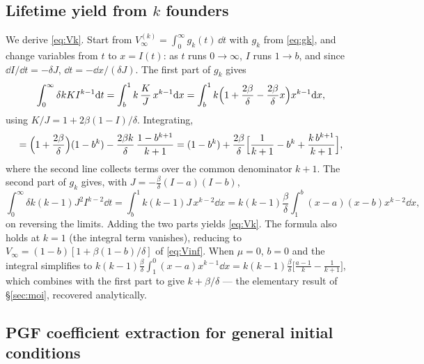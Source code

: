 \subsection{Lifetime yield from $k$ founders}
\label{app:Vk}

We derive \eqref{eq:Vk}. Start from
$V_\infty^{(k)}=\int_0^\infty g_k(t)\,\dd t$ with $g_k$ from
\eqref{eq:gk}, and change variables from $t$ to $x=I(t)$: as $t$ runs
$0\to\infty$, $I$ runs $1\to b$, and since $\dd I/\dd t=-\delta J$,
$\dd t=-\dd x/(\delta J)$. The first part of $g_k$ gives
$$
\int_0^\infty\delta k K I^{k-1}{\rm d} t
=\int_b^1 k\,\frac{K}{J}\,x^{k-1}{\rm d} x
=\int_b^1 k\Bigl(1+\frac{2\beta}{\delta}-\frac{2\beta}{\delta}x\Bigr)
x^{k-1}{\rm d} x,
$$
using $K/J=1+2\beta(1-I)/\delta$. Integrating,
$$
=\Bigl(1+\frac{2\beta}{\delta}\Bigr)(1-b^k)
-\frac{2\beta k}{\delta}\,\frac{1-b^{k+1}}{k+1}
=(1-b^k)+\frac{2\beta}{\delta}
\Bigl[\frac{1}{k+1}-b^k+\frac{k\,b^{k+1}}{k+1}\Bigr],
$$
where the second line collects terms over the common denominator $k+1$.
The second part of $g_k$ gives, with
$J=-\frac{\beta}{\delta}(I-a)(I-b)$,
$$
\int_0^\infty\delta k(k-1)J^2 I^{k-2}\dd t
=\int_b^1 k(k-1)J\,x^{k-2}\dd x
=k(k-1)\frac{\beta}{\delta}\int_1^b (x-a)(x-b)x^{k-2}\dd x,
$$
on reversing the limits. Adding the two parts yields \eqref{eq:Vk}. The
formula also holds at $k=1$ (the integral term vanishes), reducing to
$V_\infty=(1-b)[1+\beta(1-b)/\delta]$ of \eqref{eq:Vinf}. When $\mu=0$,
$b=0$ and the integral simplifies to
$k(k-1)\frac{\beta}{\delta}\int_1^0(x-a)x^{k-1}\dd x
=k(k-1)\frac{\beta}{\delta}\bigl[\frac{a-1}{k}-\frac{1}{k+1}\bigr]$,
which combines with the first part to give $k+\beta/\delta$ --- the
elementary result of \S\ref{sec:moi}, recovered analytically.

\subsection{PGF coefficient extraction for general initial conditions}
\label{app:pgf-extract}

